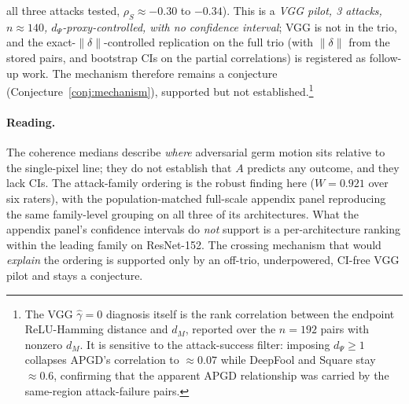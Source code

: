 all three attacks tested, $\rho_S\approx-0.30$ to $-0.34$). This is a
\emph{VGG pilot, 3 attacks, $n\approx140$, $d_\Psi$-proxy-controlled, with no
confidence interval}; VGG is not in the trio, and the
exact-$\|\delta\|$-controlled replication on the full trio (with
$\|\delta\|$ from the stored pairs, and bootstrap CIs on the partial
correlations) is registered as follow-up work. The mechanism therefore
remains a conjecture (Conjecture~\ref{conj:mechanism}), supported but not
established.\footnote{The VGG $\widehat\gamma=0$ diagnosis itself is the
rank correlation between the endpoint ReLU-Hamming distance and $d_M$,
reported over the $n=192$ pairs with nonzero $d_M$. It is sensitive to the
attack-success filter: imposing $d_\Psi\ge1$ collapses APGD's correlation to
$\approx0.07$ while DeepFool and Square stay $\approx0.6$, confirming that
the apparent APGD relationship was carried by the same-region
attack-failure pairs.}


\paragraph{Reading.}
The coherence medians describe \emph{where} adversarial germ motion sits
relative to the single-pixel line; they do not establish that $A$ predicts
any outcome, and they lack CIs. The attack-family ordering is the robust
finding here ($W=0.921$ over six raters), with the population-matched
full-scale appendix panel reproducing the same family-level grouping on all
three of its architectures. What the appendix panel's confidence intervals
do \emph{not} support is a per-architecture ranking within the leading
family on ResNet-152. The crossing
mechanism that would \emph{explain} the ordering is supported only by an
off-trio, underpowered, CI-free VGG pilot and stays a conjecture.

